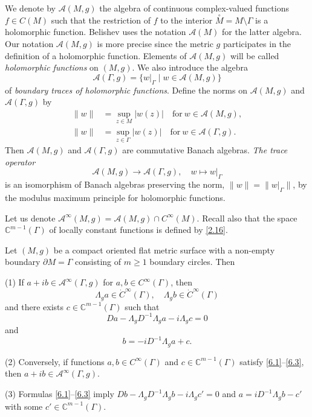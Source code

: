 \documentclass[12pt,reqno]{amsart}
\begin{document}
We denote by ${\mathcal A}(M,g)$ the algebra of continuous complex-valued functions
$f\in C(M)$ such that the restriction of $f$ to the interior $\stackrel\circ M=M\setminus\Gamma$ is a holomorphic function.
Belishev \cite{Be} uses the notation ${\mathcal A}(M)$ for the latter algebra. Our notation ${\mathcal A}(M,g)$ is more precise since the  metric $g$ participates in the definition of a holomorphic function.
Elements of ${\mathcal A}(M,g)$ will be called {\it holomorphic functions} on $(M,g)$.
We also introduce the algebra
$$
{\mathcal A}(\Gamma,g)=\{w|_{\Gamma}\mid w\in{\mathcal A}(M,g)\}
$$
of {\it boundary traces of holomorphic functions}.
Define the norms on ${\mathcal A}(M,g)$ and ${\mathcal A}(\Gamma,g)$ by
$$
\begin{aligned}
\|w\|&=\sup\limits_{z\in M}|w(z)|\quad\mbox{for}\ w\in {\mathcal A}(M,g),\\
\|w\|&=\sup\limits_{z\in\Gamma}|w(z)|\quad\mbox{for}\ w\in {\mathcal A}(\Gamma,g).
\end{aligned}
$$
Then ${\mathcal A}(M,g)$ and ${\mathcal A}(\Gamma,g)$ are  commutative Banach algebras. {\it The trace operator}
$$
{\mathcal A}(M,g)\to{\mathcal A}(\Gamma,g),\quad w\mapsto w|_{\Gamma}
$$
is an isomorphism of Banach algebras preserving the norm, $\|w\|=\|w|_\Gamma\|$, by the modulus maximum principle for holomorphic functions.

Let us denote ${\mathcal A}^\infty(M,g)={\mathcal A}(M,g)\cap C^\infty(M)$. Recall also that the space ${\mathbb C}^{m-1}(\Gamma)$ of locally constant functions is defined by \eqref{2.16}.

\begin{proposition} \label{P6.1}
Let $(M,g)$ be a compact oriented flat metric surface with a non-empty boundary $\partial M=\Gamma$ consisting of $m\ge1$ boundary circles. Then

{\rm (1)} If  $a+ib\in{\mathcal A}^\infty(\Gamma,g)$
for $a,b\in C^\infty(\Gamma)$, then
\begin{equation}
\Lambda_ga\in \dot C^\infty(\Gamma),\quad
\Lambda_gb\in \dot C^\infty(\Gamma)
                                \label{6.1}
\end{equation}
and there exists $c\in{\mathbb C}^{m-1}(\Gamma)$ such that
\begin{equation}
Da-\Lambda_gD^{-1}\Lambda_ga-i\Lambda_gc=0
                                \label{6.2}
\end{equation}
and
\begin{equation}
b=-iD^{-1}\Lambda_ga+c.
                                \label{6.3}
\end{equation}

{\rm (2)} Conversely, if functions $a,b\in C^\infty(\Gamma)$ and $c\in{\mathbb C}^{m-1}(\Gamma)$ satisfy \eqref{6.1}--\eqref{6.3}, then $a+ib\in{\mathcal A}^\infty(\Gamma,g)$.

{\rm (3)} Formulas \eqref{6.1}--\eqref{6.3} imply
$
Db-\Lambda_gD^{-1}\Lambda_gb-i\Lambda_gc'=0
$
and
$
a=iD^{-1}\Lambda_gb-c'
$
with some $c'\in{\mathbb C}^{m-1}(\Gamma)$.
\end{proposition}
\end{document}
